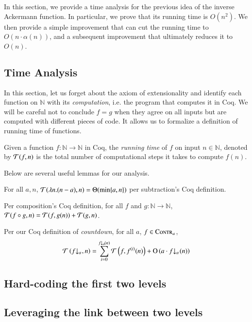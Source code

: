 In this section, we provide a time analysis for the previous idea of the inverse Ackermann function. In particular, we prove that its running time is $O(n^2)$. We then provide a simple improvement that can cut the running time to $O(n\cdot\alpha(n))$, and a subsequent improvement that ultimately reduces it to $O(n)$.
\subsection{Time Analysis}
In this section, let us forget about the axiom of extensionality and identify each function on $\mathbb{N}$ with its \emph{computation}, i.e. the program that computes it in Coq. We will be careful not to conclude $f = g$ when they agree on all inputs but are computed with different pieces of code. It allows us to formalize a definition of running time of functions.
\begin{defn}
	Given a function $f:\mathbb{N}\to\mathbb{N}$ in Coq, the \emph{running time} of $f$ on input $n\in \mathbb{N}$, denoted by $\mathcal{T}(f, n)$ is the total number of computational steps it takes to compute $f(n)$.
\end{defn}
Below are several useful lemmas for our analysis.
\begin{lem}
	For all $a, n$, $\mathcal{T}(\lambda n.(n - a), n) = \Theta(\min\{a, n\})$ per subtraction's Coq definition.
\end{lem}
\begin{lem}
	Per composition's Coq definition, for all $f$ and $g: \mathbb{N}\to \mathbb{N}$, $\mathcal{T}(f\circ g, n) = \mathcal{T}(f, g(n)) + \mathcal{T}(g, n)$.
\end{lem}
\begin{lem}
	Per our Coq definition of \emph{countdown}, for all $a$, $f\in \text{\scshape{Contr}}_{a}$, $$\runtime\left(\cdt{f}{a}\ , n\right) = \sum_{i=0}^{\cdt{f}{a}(n)} \runtime\left(f, f^{(i)}(n)\right) + \bigO\left(a\cdot \cdt{f}{a}(n)\right) $$
\end{lem}
\subsection{Hard-coding the first two levels}

\subsection{Leveraging the link between two levels}